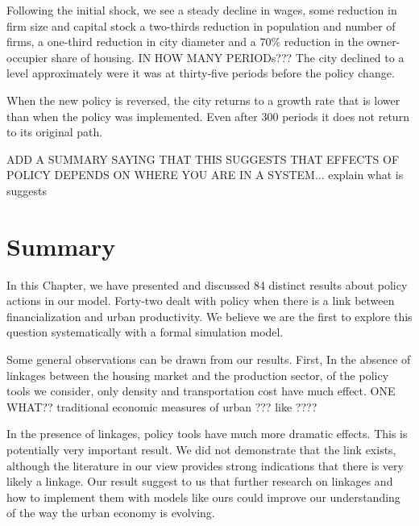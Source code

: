 Following the initial shock, we see a steady decline in wages, some reduction in firm size and capital stock a two-thirds reduction in population and number of firms,  a one-third reduction in city diameter and a 70\% reduction in the owner-occupier share of housing. IN HOW MANY PERIODs??? The city declined to a level approximately were it was at thirty-five periods before the policy change.

When the new policy is reversed, the city returns to a growth rate that is lower than when the policy was implemented. Even after 300 periods it does not return to its original path.



{\color{red} ADD A SUMMARY SAYING THAT THIS SUGGESTS THAT EFFECTS OF POLICY DEPENDS ON WHERE YOU ARE IN A SYSTEM... explain what is suggests }

\section{Summary}
In this Chapter, we have presented and discussed 84 distinct results about policy actions in our model. Forty-two dealt with policy when there is a link between financialization and urban productivity. We believe we are the first to explore this question systematically with a formal simulation model.

Some general observations can be drawn from our results. First, In the absence of linkages between the housing market and the production sector, of the policy tools we consider, only density and transportation cost have much effect. {\color{red} ONE WHAT?? traditional economic measures of urban ??? like ????}



In the presence of linkages, policy tools have much more dramatic effects. This is potentially very important result. 
We did not demonstrate that the link exists, although the literature in our view provides strong indications that there is very likely a linkage.  Our result suggest to us that further research on linkages and how to implement them with models like ours could improve our understanding of the way the urban economy is evolving.   


